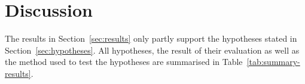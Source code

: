 


%
%
%


\section{Discussion} \label{sec:discussion-sec5}

The results in \mbox{Section~\ref{sec:results}} only partly support the hypotheses stated in \mbox{Section~\ref{sec:hypotheses}}. All hypotheses, the result of their evaluation as well as the method used to test the hypotheses are summarised in \mbox{Table~\ref{tab:summary-results}}.

